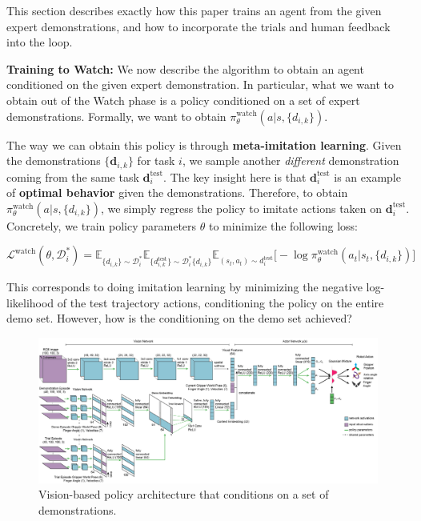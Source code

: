\documentclass[
  letterpaper,
  DIV=11,
  numbers=noendperiod,
  oneside]{scrreprt}
\theoremstyle{remark}
\begin{document}
This section describes exactly how this paper trains an agent from the
given expert demonstrations, and how to incorporate the trials and human
feedback into the loop.

\textbf{Training to Watch:} We now describe the algorithm to obtain an
agent conditioned on the given expert demonstration. In particular, what
we want to obtain out of the Watch phase is a policy conditioned on a
set of expert demonstrations. Formally, we want to obtain
\(\pi_\theta^{\text{watch}}(a | s, \{d_{i,k}\})\).

The way we can obtain this policy is through \textbf{meta-imitation
learning}. Given the demonstrations \(\{\textbf{d}_{i,k}\}\) for task
\(i\), we sample another \emph{different} demonstration coming from the
same task \(\textbf{d}_i^{\text{test}}\). The key insight here is that
\(\textbf{d}_i^{\text{test}}\) is an example of \textbf{optimal
behavior} given the demonstrations. Therefore, to obtain
\(\pi_\theta^{\text{watch}}(a | s, \{d_{i,k}\})\), we simply regress the
policy to imitate actions taken on \(\textbf{d}_i^{\text{test}}\).
Concretely, we train policy parameters \(\theta\) to minimize the
following loss:

\(\mathcal{L}^\text{watch}(\theta, \mathcal{D}_i^*) = \mathbb{E}_{\{d_{i,k}\} \sim \mathcal{D}_i^*} \mathbb{E}_{\{d_{i,k}^{\text{test}}\} \sim \mathcal{D}_i^*  \{d_{i,k}\}} \mathbb{E}_{(s_t, a_t) \sim d_i^{\text{test}}} \big[
- \log \pi_\theta^{\text{watch}} (a_t | s_t, \{d_{i,k}\}) \big]\)

This corresponds to doing imitation learning by minimizing the negative
log-likelihood of the test trajectory actions, conditioning the policy
on the entire demo set. However, how is the conditioning on the demo set
achieved?

\begin{figure}

{\centering \includegraphics{src/Figures/watch-try-learn-architecture.png}

}

\caption{Vision-based policy architecture that conditions on a set of
demonstrations.}

\end{figure}%
\end{document}
